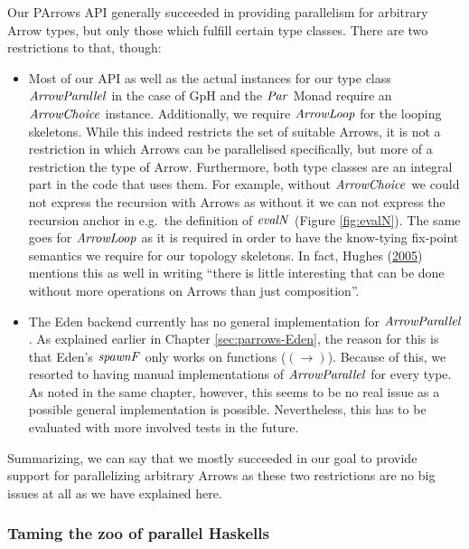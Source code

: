 \documentclass[paper=A4,twoside=true,openright,parskip=full,chapterprefix=true,headings=normal,bibliography=totoc,listof=totoc,titlepage=on,captions=tableabove,draft=false,british]{scrreprt}%
\renewcommand{\enquote}[1]{{``}#1{''}}
\begin{document}
Our PArrows API generally succeeded in providing parallelism for
arbitrary Arrow types, but only those which fulfill certain type
classes. There are two restrictions to that, though:

\begin{itemize}
\item
  Most of our API as well as the actual instances for our type class
  \ensuremath{\Conid{ArrowParallel}} in the case of GpH and the \ensuremath{\Conid{Par}} Monad require an
  \ensuremath{\Conid{ArrowChoice}} instance. Additionally, we require \ensuremath{\Conid{ArrowLoop}} for the
  looping skeletons. While this indeed restricts the set of suitable
  Arrows, it is not a restriction in which Arrows can be parallelised
  specifically, but more of a restriction the type of Arrow.
  Furthermore, both type classes are an integral part in the code that
  uses them. For example, without \ensuremath{\Conid{ArrowChoice}} we could not express the
  recursion with Arrows as without it we can not express the recursion
  anchor in e.g.~the definition of \ensuremath{\Varid{evalN}} (Figure \ref{fig:evalN}). The
  same goes for \ensuremath{\Conid{ArrowLoop}} as it is required in order to have the
  know-tying fix-point semantics we require for our topology skeletons.
  In fact, Hughes (\protect\hyperlink{ref-Hughes2005}{2005}) mentions
  this as well in writing
  \enquote{there is little interesting that can be done without
  more operations on Arrows than just composition}.
\item
  The Eden backend currently has no general implementation for
  \ensuremath{\Conid{ArrowParallel}}. As explained earlier in Chapter
  \ref{sec:parrows-Eden}, the reason for this is that Eden's \ensuremath{\Varid{spawnF}}
  only works on functions (\ensuremath{(\to )}). Because of this, we resorted to
  having manual implementations of \ensuremath{\Conid{ArrowParallel}} for every type. As
  noted in the same chapter, however, this seems to be no real issue as
  a possible general implementation is possible. Nevertheless, this has
  to be evaluated with more involved tests in the future.
\end{itemize}

Summarizing, we can say that we mostly succeeded in our goal to provide
support for parallelizing arbitrary Arrows as these two restrictions are
no big issues at all as we have explained here.

\hypertarget{taming-the-zoo-of-parallel-haskells}{%
\subsubsection{Taming the zoo of parallel
Haskells}\label{taming-the-zoo-of-parallel-haskells}}
\end{document}
